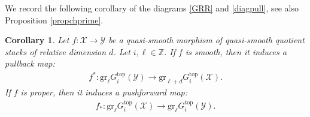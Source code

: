 \documentclass [11pt,oneside,a4paper,mathscr]{amsart}
\newtheorem{cor}[thm]{Corollary}
\theoremstyle{definition}
\renewcommand{\geq}{\geqslant}
\newcommand{\X}{\mathscr{X}}
\begin{document}
We record the following corollary of the diagrams \eqref{GRR} and \eqref{diagpull}, see also Proposition \ref{propchprime}.

\begin{cor}\label{functoriality:Ktop2}
Let $f\colon \X\to \mathscr{Y}$ be a quasi-smooth morphism of quasi-smooth quotient stacks of relative dimension $d$. Let $i, \ell\in\mathbb{Z}$.
If $f$ is smooth, then it induces a pullback map:
\begin{align*}
    f^*\colon \mathrm{gr}_\ell G^{\mathrm{top}}_i(\mathscr{Y})\to \mathrm{gr}_{\ell+d} G^{\mathrm{top}}_i(\X).
\end{align*}
If $f$ is proper, then it induces a pushforward map:
\begin{align*}
    f_*\colon \mathrm{gr}_\ell G^{\mathrm{top}}_i(\X)\to \mathrm{gr}_\ell G^{\mathrm{top}}_i(\mathscr{Y}).
\end{align*}
\end{cor}

\end{document}
